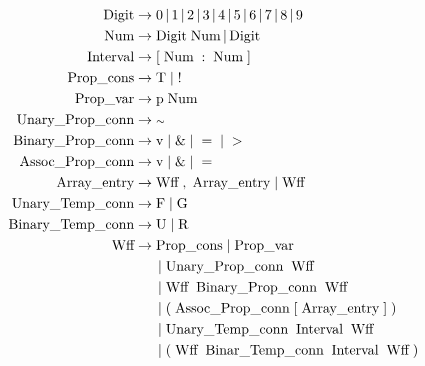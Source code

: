 \documentclass[runningheads]{llncs}
\begin{document}
\begin{align*}
    \text{Digit} &\to 0 \,|\, 1 \,|\,2 \,|\,3 \,|\,4 \,|\,5 \,|\,6 \,|\,7 \,|\, 8 \,|\, 9 \\
    \text{Num} &\to \text{Digit} \; \text{Num} \,|\, \text{Digit} \\
    \text{Interval} &\to [ \; \text{Num} \; : \; \text{Num} \; ] \\
    \text{Prop\_cons} &\to \text{T} \;|\; ! \\
    \text{Prop\_var} &\to \text{p} \; \text{Num} \\
    \text{Unary\_Prop\_conn} &\to \hspace{1mm}\scriptstyle{\sim} \\
    \text{Binary\_Prop\_conn} &\to \text{v} \;|\; \& \;|\; = \;|\; > \\
    \text{Assoc\_Prop\_conn} &\to \text{v} \;|\; \& \;|\; = \\
    \text{Array\_entry} &\to \text{Wff} \; , \; \text{Array\_entry} \;|\; \text{Wff} \\
    \text{Unary\_Temp\_conn} &\to \text{F} \;|\; \text{G} \\
    \text{Binary\_Temp\_conn} &\to \text{U} \;|\; \text{R} \\
    \text{Wff} &\to \text{Prop\_cons} \;|\; \text{Prop\_var} \\
               &\hspace{5mm} \;|\; \text{Unary\_Prop\_conn} \;\; \text{Wff} \\
               &\hspace{5mm} \;|\; \text{Wff} \;\; \text{Binary\_Prop\_conn} \;\; \text{Wff}\\
               &\hspace{5mm} \;|\; ( \; \text{Assoc\_Prop\_conn} \; [ \; \text{Array\_entry} \; ] \; ) \\
               &\hspace{5mm} \;|\; \text{Unary\_Temp\_conn} \;\; \text{Interval} \;\; \text{Wff} \\
               &\hspace{5mm} \;|\; ( \; \text{Wff} \;\; \text{Binar\_Temp\_conn} \;\; \text{Interval} \;\; \text{Wff} \; )
\end{align*}
\end{document}
